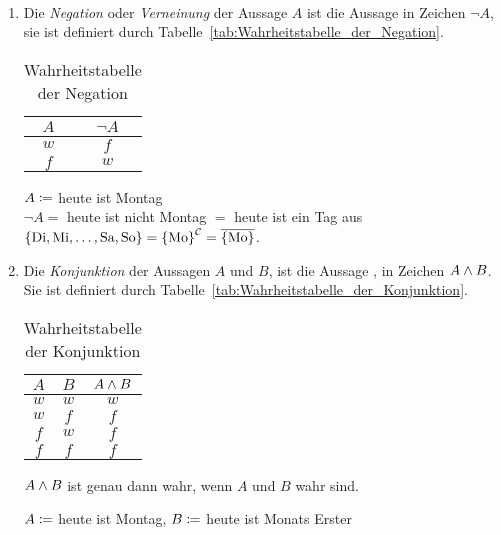\begin{definition}~
\begin{enumerate}
\item Die \emph{Negation} oder \emph{Verneinung} der Aussage $A$ ist die Aussage  in Zeichen $\neg A$, sie ist definiert durch Tabelle~\vref{tab:Wahrheitstabelle_der_Negation}.
	\begin{table}[htb]
	\center
	\begin{tabular}{c||c}
	$A$ & $\neg A$\\\hline
	$w$ & $f$\\
	$f$ & $w$
	\end{tabular}
	\caption{Wahrheitstabelle der Negation}
	\label{tab:Wahrheitstabelle_der_Negation}
	\end{table}

	\begin{example}
	$A \mathrel{\mathop:\!\!=}$ heute ist Montag\\
	$\neg A =$ heute ist nicht Montag $=$ heute ist ein Tag aus $\left\{\text{Di}, \text{Mi}, \dots, \text{Sa}, \text{So}\right\} = \left\{\text{Mo}\right\}^{\mathcal{C}} = \overline{\left\{\text{Mo}\right\}}$.
	\end{example}

\item Die \emph{Konjunktion} der Aussagen $A$ und $B$, ist die Aussage , in Zeichen $A \wedge B$. Sie ist definiert durch Tabelle~\vref{tab:Wahrheitstabelle_der_Konjunktion}.
	\begin{table}[htb]
	\center
	\begin{tabular}{c|c||c}
	$A$ & $B$ & $A \wedge B$\\\hline
	$w$ & $w$ & $w$\\
	$w$ & $f$ & $f$\\
	$f$ & $w$ & $f$\\
	$f$ & $f$ & $f$\\
	\end{tabular}
	\caption{Wahrheitstabelle der Konjunktion}
	\label{tab:Wahrheitstabelle_der_Konjunktion}
	\end{table}
	$A \wedge B$ ist genau dann wahr, wenn $A$ und $B$ wahr sind.

	\begin{example}
	$A \mathrel{\mathop:\!\!=}$ heute ist Montag, $B \mathrel{\mathop:\!\!=}$ heute ist Monats Erster
	\end{example}


\end{enumerate}
\end{definition}

